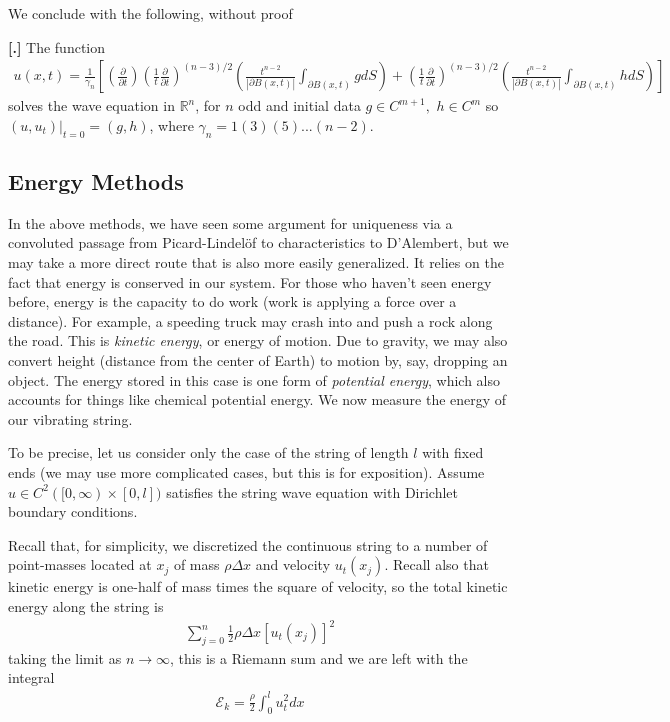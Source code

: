 \documentclass{article}
\newcommand{\R}{{\mathbb{R}}}
\newcommand{\pd}{\partial}
\newcounter{result}[section]
\newenvironment{res}[1][]{\refstepcounter{result}\par\medskip
	\noindent \textbf{[\thesection.\theresult] #1} \rmfamily}{\medskip}
\begin{document}
	We conclude with the following, without proof
	
	\begin{res}
		The function
		\begin{align*}
			u(x,t) = \frac{1}{\gamma_{n}} \left[ \left( \frac{\pd}{\pd t}\right) \left( \frac{1}{t} \frac{\pd}{\pd t} \right)^{(n-3)/2} \left(\frac{t^{n-2}}{|\pd B(x,t)|} \int_{\pd B(x,t)} g dS \right) + \left( \frac{1}{t} \frac{\pd}{\pd t}\right)^{(n-3)/2}\left(\frac{t^{n-2}}{|\pd B(x,t)|} \int_{\pd B(x,t)} h dS \right) \right]
		\end{align*}
		solves the wave equation in $\R^{n}$, for $n$ odd and initial data $g \in C^{m+1}, \,\, h \in C^{m}$ so $(u,u_t)|_{t=0} = (g,h)$, where $\gamma_{n} = 1(3)(5)...(n-2)$. 
	\end{res}
	
	
	
	
	
	\subsection{Energy Methods}
	
	In the above methods, we have seen some argument for uniqueness via a convoluted passage from Picard-Lindel{\"o}f to characteristics to D'Alembert, but we may take a more direct route that is also more easily generalized. It relies on the fact that energy is conserved in our system. For those who haven't seen energy before, energy is the capacity to do work (work is applying a force over a distance). For example, a speeding truck may crash into and push a rock along the road. This is \textit{kinetic energy}, or energy of motion. Due to gravity, we may also convert height (distance from the center of Earth) to motion by, say, dropping an object. The energy stored in this case is one form of \textit{potential energy}, which also accounts for things like chemical potential energy. We now measure the energy of our vibrating string. 
	
	To be precise, let us consider only the case of the string of length $l$ with fixed ends (we may use more complicated cases, but this is for exposition). Assume $u \in C^{2}([0,\infty) \times [0,l])$ satisfies the string wave equation with Dirichlet boundary conditions. 
	
	Recall that, for simplicity, we discretized the continuous string to a number of point-masses located at $x_j$ of mass $\rho \Delta x$ and velocity $u_{t}(x_j)$. Recall also that kinetic energy is one-half of mass times the square of velocity, so the total kinetic energy along the string is  
	\begin{align*}
		\sum_{j=0}^{n} \frac{1}{2} \rho \Delta x \left[ u_{t}(x_j)\right]^2
	\end{align*}
	taking the limit as $n \to \infty$, this is a Riemann sum and we are left with the integral 
	\begin{align*}
		\mathcal{E}_{k} = \frac{\rho}{2} \int_{0}^{l} u_{t}^{2} dx
	\end{align*}
	
\end{document}
